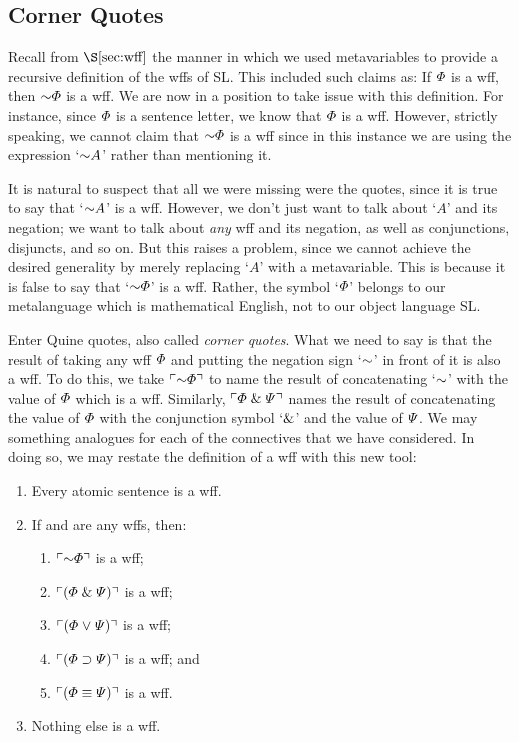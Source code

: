 \subsection{Corner Quotes}
  \label{sec:Corner Quotes}

Recall from $\S\ref{sec:wff}$ the manner in which we used metavariables to provide a recursive definition of the wffs of SL.
This included such claims as: If $\varPhi{}$ is a wff, then $\enot \metaA{}$ is a wff.
We are now in a position to take issue with this definition.
For instance, since $\varPhi$ is a sentence letter, we know that $\varPhi$ is a wff. 
However, strictly speaking, we cannot claim that $\enot \metaA$ is a wff since in this instance we are using the expression `$\enot A$' rather than mentioning it.

It is natural to suspect that all we were missing were the quotes, since it is true to say that `$\enot A$' is a wff.
However, we don't just want to talk about `$A$' and its negation; we want to talk about \textit{any} wff and its negation, as well as conjunctions, disjuncts, and so on.
But this raises a problem, since we cannot achieve the desired generality by merely replacing `$A$' with a metavariable.
This is because it is false to say that `$\enot \metaA{}$' is a wff.
Rather, the symbol `$\varPhi{}$' belongs to our metalanguage which is mathematical English, not to our object language SL.

Enter Quine quotes, also called \textit{corner quotes}.
What we need to say is that the result of taking any wff $\varPhi{}$ and putting the negation sign `$\enot$' in front of it is also a wff.
To do this, we take $\corner{\enot \metaA{}}$ to name the result of concatenating `$\enot$' with the value of $\varPhi$ which is a wff. 
Similarly, $\ulcorner\varPhi{} \mathrel\& \varPsi{}\urcorner$ names the result of concatenating the value of $\varPhi{}$ with the conjunction symbol `$\mathrel\&$' and the value of $\varPsi{}$.
We may something analogues for each of the connectives that we have considered.
In doing so, we may restate the definition of a wff with this new tool:

\begin{enumerate}
  \item Every atomic sentence is a wff.
  \item If \metaA{} and \metaB{} are any wffs, then:
    \begin{enumerate}
      \item $\corner{\enot\metaA{}}$ is a wff;
      \item $\ulcorner(\varPhi{}\mathrel\&\varPsi{})\urcorner$ is a wff;
      \item $\ulcorner(\varPhi{}\mkern1mu\vee\mkern1mu\varPsi{})\urcorner$ is a wff;
      \item $\ulcorner(\varPhi{}\supset\varPsi{})\urcorner$ is a wff; and
      \item $\ulcorner(\varPhi{}\equiv\varPsi{})\urcorner$ is a wff.
    \end{enumerate}
  \item Nothing else is a wff.
\end{enumerate}

